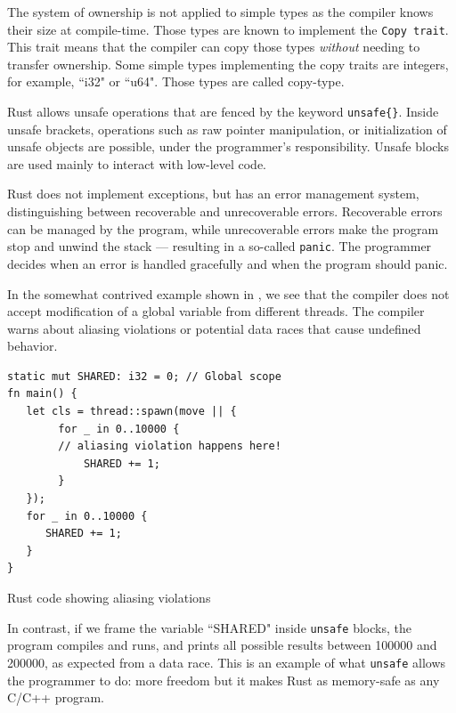 \documentclass[nomenclature, english, bibtex]{kththesis}
\begin{document}
The system of ownership is not applied to simple types as the compiler knows their size at compile-time. Those types are known to implement the \texttt{Copy trait}. This trait means that the compiler can copy those types \emph{without} needing to transfer ownership. Some simple types implementing the copy traits are integers, for example, ``i32" or ``u64". Those types are called \gls{copy-type}.

Rust allows unsafe operations that are fenced by the keyword \texttt{unsafe\{\}}. Inside unsafe brackets, operations such as raw pointer manipulation, or initialization of unsafe objects are possible, under the programmer's responsibility. Unsafe blocks are used mainly to interact with low-level code.

Rust does not implement exceptions, but has an error management system, distinguishing between recoverable and unrecoverable errors. Recoverable errors can be managed by the program, while unrecoverable errors make the program stop and unwind the stack --- resulting in a so-called \texttt{panic}. The programmer decides when an error is handled gracefully and when the program should panic.

In the somewhat contrived  example shown in , we see that the compiler does not accept modification of a global variable from different threads. The compiler warns about aliasing violations or potential data races that cause undefined behavior.
\begin{listing}[!ht]
\begin{verbatim}
static mut SHARED: i32 = 0; // Global scope
fn main() {
   let cls = thread::spawn(move || {
        for _ in 0..10000 {
        // aliasing violation happens here!
            SHARED += 1;
        }
   });
   for _ in 0..10000 {
      SHARED += 1;
   }
}
\end{verbatim}
\caption[Rust code showing aliasing violations]{Rust code showing aliasing violations}
\label{lstlisting:data_race}
\end{listing}
\FloatBarrier

In contrast, if we frame the variable ``SHARED" inside \texttt{unsafe} blocks, the program compiles and runs, and prints all possible results between 100000 and 200000, as expected from a data race. This is an example of what \texttt{unsafe} allows the programmer to do: more freedom but it makes Rust as memory-safe as any C/C++ program.
\end{document}
